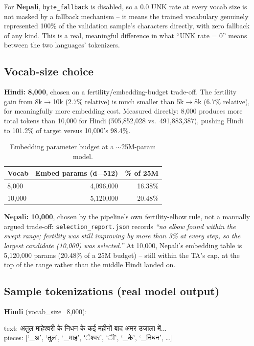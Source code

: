 \documentclass[11pt]{article}
\newcommand{\dn}[1]{{\devanagarifont #1}}
\begin{document}
For \textbf{Nepali}, \texttt{byte\_fallback} is disabled, so a 0.0 UNK
rate at every vocab size is not masked by a fallback mechanism -- it
means the trained vocabulary genuinely represented 100\% of the
validation sample's characters directly, with zero fallback of any kind.
This is a real, meaningful difference in what ``UNK rate = 0'' means
between the two languages' tokenizers.

\subsection{Vocab-size choice}

\textbf{Hindi: 8{,}000}, chosen on a fertility/embedding-budget trade-off.
The fertility gain from 8k$\to$10k (2.7\% relative) is much smaller than
5k$\to$8k (6.7\% relative), for meaningfully more embedding cost. Measured
directly: 8{,}000 produces more total tokens than 10{,}000 for Hindi
(505{,}852{,}028 vs.\ 491{,}883{,}387), pushing Hindi to 101.2\% of target
versus 10{,}000's 98.4\%.

\begin{table}[htbp]
\centering
\begin{tabular}{lrr}
\toprule
Vocab & Embed params (d=512) & \% of 25M \\
\midrule
8{,}000 & 4{,}096{,}000 & 16.38\% \\
10{,}000 & 5{,}120{,}000 & 20.48\% \\
\bottomrule
\end{tabular}
\caption{Embedding parameter budget at a $\sim$25M-param model.}
\end{table}

\textbf{Nepali: 10{,}000}, chosen by the pipeline's own fertility-elbow
rule, not a manually argued trade-off:
\texttt{selection\_report.json} records \textit{``no elbow found within
the swept range; fertility was still improving by more than 3\% at every
step, so the largest candidate (10{,}000) was selected.''} At 10{,}000,
Nepali's embedding table is 5{,}120{,}000 params (20.48\% of a 25M
budget) -- still within the TA's cap, at the top of the range rather than
the middle Hindi landed on.

\subsection{Sample tokenizations (real model output)}

\textbf{Hindi} (vocab\_size=8,000):

\dn{text: अतुल माहेश्वरी के निधन के कई महीनों बाद अमर उजाला में...} \\
pieces: [`\dn{\_अ}', `\dn{तुल}', `\dn{\_माह}', `\dn{ेश्वर}', `\dn{ी}', `\dn{\_के}', `\dn{\_निधन}', \ldots]
\end{document}
